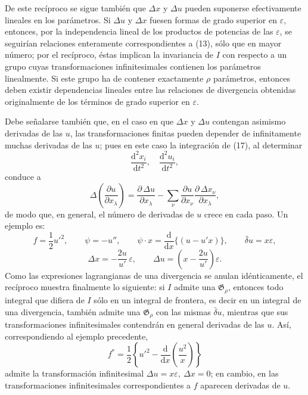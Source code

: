 \documentclass[11pt]{article}
\newcommand{\D}{\Delta}
\newcommand{\eps}{\varepsilon}
\providecommand{\dd}{\mathrm d}
\providecommand{\G}{\mathfrak G}
\providecommand{\bd}{\bar{\delta}}
\providecommand{\p}{\partial}
\begin{document}
De este recíproco se sigue también que \(\D x\) y \(\D u\) pueden suponerse efectivamente lineales en los parámetros. Si \(\D u\) y \(\D x\) fuesen formas de grado superior en \(\eps\), entonces, por la independencia lineal de los productos de potencias de las \(\eps\), se seguirían relaciones enteramente correspondientes a (13), sólo que en mayor número; por el recíproco, éstas implican la invariancia de \(I\) con respecto a un grupo cuyas transformaciones infinitesimales contienen los parámetros linealmente. Si este grupo ha de contener exactamente \(\rho\) parámetros, entonces deben existir dependencias lineales entre las relaciones de divergencia obtenidas originalmente de los términos de grado superior en \(\eps\).

Debe señalarse también que, en el caso en que \(\D x\) y \(\D u\) contengan asimismo derivadas de las \(u\), las transformaciones finitas pueden depender de infinitamente muchas derivadas de las \(u\); pues en este caso la integración de (17), al determinar
\[
\frac{\dd^2x_i}{\dd t^2},\quad \frac{\dd^2u_i}{\dd t^2},
\]
conduce a
\[
\D\!\left(\frac{\p u}{\p x_\lambda}\right)
=\frac{\p\,\D u}{\p x_\lambda}
-\sum_\nu\frac{\p u}{\p x_\nu}
\frac{\p\,\D x_\nu}{\p x_\lambda},
\]
de modo que, en general, el número de derivadas de \(u\) crece en cada paso. Un ejemplo es:
\[
f=\frac12 u'^2,\qquad
\psi=-u'',\qquad
\psi\cdot x=\frac{\dd}{\dd x}\{(u-u'x)\},\qquad
\bd u=x\eps,
\]
\[
\D x=-\frac{2u}{u'}\,\eps,\qquad
\D u=\left(x-\frac{2u}{u'}\right)\eps.
\]
Como las expresiones lagrangianas de una divergencia se anulan idénticamente, el recíproco muestra finalmente lo siguiente: si \(I\) admite una \(\G_\rho\), entonces todo integral que difiera de \(I\) sólo en un integral de frontera, es decir en un integral de una divergencia, también admite una \(\G_\rho\) con las mismas \(\bd u\), mientras que sus transformaciones infinitesimales contendrán en general derivadas de las \(u\). Así, correspondiendo al ejemplo precedente,
\[
f^*=\frac12\left\{u'^2-\frac{\dd}{\dd x}\left(\frac{u^2}{x}\right)\right\}
\]
admite la transformación infinitesimal \(\D u=x\eps,\ \D x=0\); en cambio, en las transformaciones infinitesimales correspondientes a \(f\) aparecen derivadas de \(u\).
\end{document}
